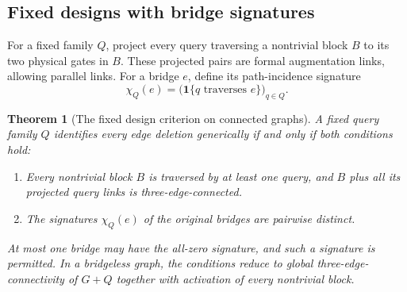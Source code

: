 \documentclass[11pt,letterpaper]{article}
\newtheorem{theorem}{Theorem}
\begin{document}
\subsection{Fixed designs with bridge signatures}
For a fixed family $Q$, project every query traversing a nontrivial block $B$ to its two physical gates in $B$. These projected pairs are formal augmentation links, allowing parallel links. For a bridge $e$, define its path-incidence signature
\[
 \chi_Q(e)=\bigl(\mathbf 1\{q\text{ traverses }e\}\bigr)_{q\in Q}.
\]

\begin{theorem}[The fixed design criterion on connected graphs]\label{thm:connectedfixed}
A fixed query family $Q$ identifies every edge deletion generically if and only if both conditions hold:
\begin{enumerate}
\item Every nontrivial block $B$ is traversed by at least one query, and $B$ plus all its projected query links is three-edge-connected.
\item The signatures $\chi_Q(e)$ of the original bridges are pairwise distinct.
\end{enumerate}
At most one bridge may have the all-zero signature, and such a signature is permitted. In a bridgeless graph, the conditions reduce to global three-edge-connectivity of $G+Q$ together with activation of every nontrivial block.
\end{theorem}
\end{document}
